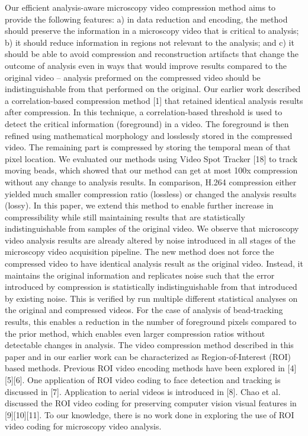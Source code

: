 Our efficient analysis-aware microscopy video compression method aims to provide the following features: a) in data reduction and encoding, the method should preserve the information in a microscopy video that is critical to analysis; b) it should reduce information in regions not relevant to the analysis; and c) it should be able to avoid compression and reconstruction artifacts that change the outcome of analysis even in ways that would improve results compared to the original video – analysis preformed on the compressed video should be indistinguishable from that performed on the original.
Our earlier work described a correlation-based compression method [1] that retained identical analysis results after compression. In this technique, a correlation-based threshold is used to detect the critical information (foreground) in a video. The foreground is then refined using mathematical morphology and losslessly stored in the compressed video. The remaining part is compressed by storing the temporal mean of that pixel location. We evaluated our methods using Video Spot Tracker [18] to track moving beads, which showed that our method can get at most 100x compression without any change to analysis results.  In comparison, H.264 compression either yielded much smaller compression ratio (lossless) or changed the analysis results (lossy).
In this paper, we extend this method to enable further increase in compressibility while still maintaining results that are statistically indistinguishable from samples of the original video. We observe that microscopy video analysis results are already altered by noise introduced in all stages of the microscopy video acquisition pipeline. The new method does not force the compressed video to have identical analysis result as the original video. Instead, it maintains the original information and replicates noise such that the error introduced by compression is statistically indistinguishable from that introduced by existing noise. This is verified by run multiple different statistical analyses on the original and compressed videos. For the case of analysis of bead-tracking results, this enables a reduction in the number of foreground pixels compared to the prior method, which enables even larger compression ratios without detectable changes in analysis.
The video compression method described in this paper and in our earlier work can be characterized as Region-of-Interest (ROI) based methods.  Previous ROI video encoding methods have been explored in [4][5][6]. One application of ROI video coding to face detection and tracking is discussed in [7]. Application to aerial videos is introduced in [8]. Chao et al. discussed the ROI video coding for preserving computer vision visual features in [9][10][11]. To our knowledge, there is no work done in exploring the use of ROI video coding for microscopy video analysis.
